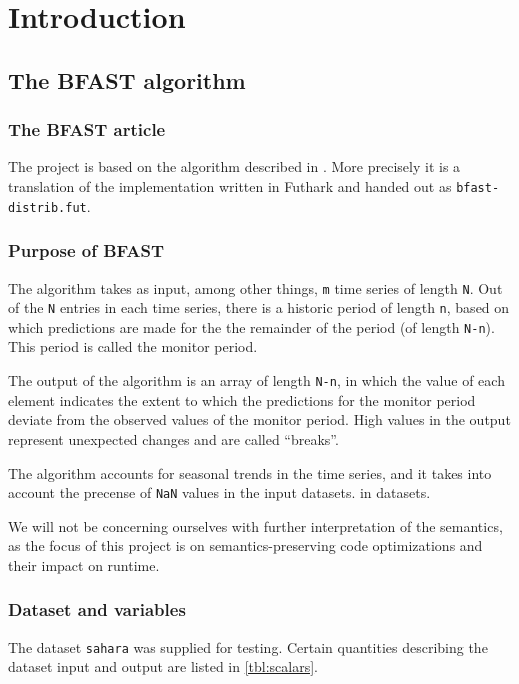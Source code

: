\section{Introduction}

\subsection{The \textsc{BFAST} algorithm}
\subsubsection{The \textsc{BFAST} article}
The project is based on the algorithm described in \cite{bfast}.
More precisely it is a translation of the implementation written in Futhark and
handed out as \texttt{bfast-distrib.fut}.

\subsubsection{Purpose of \textsc{BFAST}}
The algorithm takes as input, among other things, \texttt{m} time series of
length \texttt{N}.
Out of the \texttt{N} entries in each time series, there is a historic period
of length \texttt{n}, based on which predictions are made for the the remainder
of the period (of length \texttt{N-n}).
This period is called the monitor period.

The output of the algorithm is an array of length \texttt{N-n}, in which the
value of each element indicates the extent to which the predictions for the
monitor period deviate from the observed values of the monitor period.
High values in the output represent unexpected changes and are called
\enquote{breaks}.

The algorithm accounts for seasonal trends in the time series, and it takes
into account the precense of \texttt{NaN} values in the input datasets.
in datasets.

We will not be concerning ourselves with further interpretation of the
semantics, as the focus of this project is on semantics-preserving code
optimizations and their impact on runtime.


\subsubsection{Dataset and variables}

The dataset \texttt{sahara} was supplied for testing. Certain quantities
describing the dataset input and output are listed in \autoref{tbl:scalars}.


